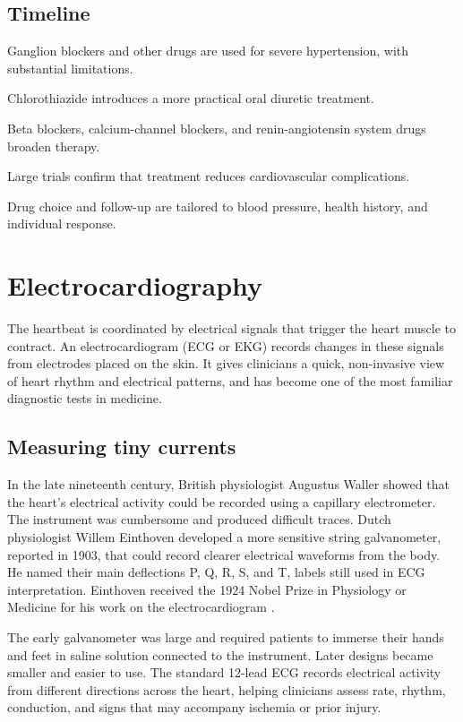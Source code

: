 \documentclass[12pt,oneside]{book}
\begin{document}
\section*{Timeline}
\begin{description}[leftmargin=2.3cm,style=nextline]
  \item[1940s--1950s] Ganglion blockers and other drugs are used for severe hypertension, with substantial limitations.
  \item[1958] Chlorothiazide introduces a more practical oral diuretic treatment.
  \item[1960s onward] Beta blockers, calcium-channel blockers, and renin-angiotensin system drugs broaden therapy.
  \item[Later twentieth century] Large trials confirm that treatment reduces cardiovascular complications.
  \item[Today] Drug choice and follow-up are tailored to blood pressure, health history, and individual response.
\end{description}
\chapter[Electrocardiography]{Electrocardiography}

The heartbeat is coordinated by electrical signals that trigger the heart
muscle to contract. An electrocardiogram (ECG or EKG) records changes in
these signals from electrodes placed on the skin. It gives clinicians a
quick, non-invasive view of heart rhythm and electrical patterns, and has
become one of the most familiar diagnostic tests in medicine.

\section{Measuring tiny currents}
In the late nineteenth century, British physiologist Augustus Waller
showed that the heart's electrical activity could be recorded using a
capillary electrometer. The instrument was cumbersome and produced
difficult traces. Dutch physiologist Willem Einthoven developed a more
sensitive string galvanometer, reported in 1903, that could record clearer
electrical waveforms from the body. He named their main deflections P, Q,
R, S, and T, labels still used in ECG interpretation. Einthoven received
the 1924 Nobel Prize in Physiology or Medicine for his work on the
electrocardiogram \cite{einthovenNobel,einthovenECGHistory}.

The early galvanometer was large and required patients to immerse their
hands and feet in saline solution connected to the instrument. Later
designs became smaller and easier to use. The standard 12-lead ECG records
electrical activity from different directions across the heart, helping
clinicians assess rate, rhythm, conduction, and signs that may accompany
ischemia or prior injury.
\end{document}
